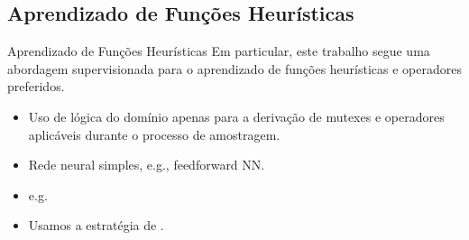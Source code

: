 \documentclass{beamer}
\begin{document}
\subsection{Aprendizado de Funções Heurísticas}

\begin{frame}{Aprendizado de Funções Heurísticas}
Em particular, este trabalho segue uma abordagem supervisionada para o aprendizado de funções heurísticas e operadores preferidos.
\begin{itemize}
  \pause
  \item Uso de lógica do domínio apenas para a derivação de mutexes e operadores aplicáveis durante o processo de amostragem.
  \pause
  \item Rede neural simples, e.g., feedforward NN.
  \pause
  \item e.g.~\cite{Ferber.etal/2020a,Yu.etal/2020,Ferber.etal/2022,OToole/2022,Bettker.etal/2022}
  \pause
  \item Usamos a estratégia de \alert{\cite{Bettker.etal/2022}}.
\end{itemize}
\end{frame}
\end{document}
